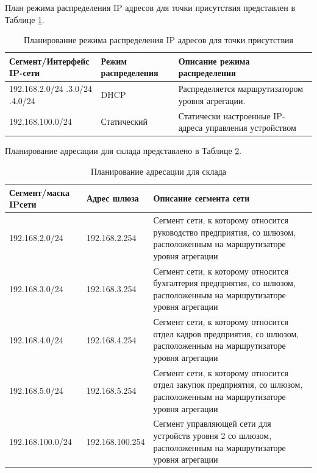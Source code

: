 \documentclass[14pt, a4paper]{extarticle}
\numberwithin{equation}{section}
\begin{document}
План режима распределения IP адресов для точки присутствия представлен в Таблице \ref{table:tpDistributionPlan}.

\begin{table}[H]
\centering
\small
\caption{Планирование режима распределения IP адресов для точки присутствия}
\label{table:tpDistributionPlan}
\begin{tabular}{|p{4cm}|p{3cm}|p{8cm}|}
\hline
\textbf{Сегмент/Интерфейс IP-сети } & \textbf{Режим распределения} & \textbf{Описание режима распределения} 
\\ \hline
192.168.2.0/24 \newline
192.168.3.0/24 \newline
192.168.4.0/24 \newline
&
DHCP
&
Распределяется маршрутизатором уровня агрегации. 
\\ \hline
192.168.100.0/24 & Статический & Статически настроенные IP-адреса управления устройством 
\\ \hline
\end{tabular}
\end{table}


Планирование адресации для склада представлено в Таблице \ref{table:warehouseIpPlan}.
\begin{table}[H]
\centering
\small
\caption{Планирование адресации для склада}
\label{table:warehouseIpPlan}
\begin{tabular}{|m{4cm}|m{3cm}|m{8cm}|}
\hline
\textbf{Сегмент/маска IPсети} & \textbf{Адрес шлюза} & \textbf{Описание сегмента сети} \\
\hline
192.168.2.0/24 & 192.168.2.254 & Сегмент сети, к которому относится руководство предприятия, со шлюзом, расположенным на маршрутизаторе уровня агрегации
\\ \hline
192.168.3.0/24 & 192.168.3.254 & Сегмент сети, к которому относится бухгалтерия предприятия, со шлюзом, расположенным на маршрутизаторе уровня агрегации
\\ \hline
192.168.4.0/24 & 192.168.4.254 & Сегмент сети, к которому относится отдел кадров предприятия, со шлюзом, расположенным на маршрутизаторе уровня агрегации
\\ \hline
192.168.5.0/24 & 192.168.5.254 & Сегмент сети, к которому относится отдел закупок предприятия, со шлюзом, расположенным на маршрутизаторе уровня агрегации
\\ \hline
192.168.100.0/24 & 192.168.100.254 & Сегмент управляющей сети для устройств уровня 2 со шлюзом, расположенным на маршрутизаторе уровня агрегации 
\\ \hline
\end{tabular}
\end{table}
\end{document}
